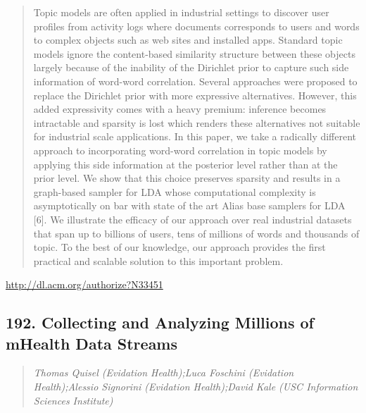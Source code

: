 \documentclass{article}
\begin{document}
\begin{quote}
Topic models are often applied in industrial settings to discover user profiles from activity logs where documents corresponds to users and words to complex objects such as web sites and installed apps. Standard topic models ignore the content-based similarity structure between these objects largely because of the inability of the Dirichlet prior to capture such side information of word-word correlation. Several approaches were proposed to replace the Dirichlet prior with more expressive alternatives. However, this added expressivity comes with a heavy premium: inference becomes intractable and sparsity is lost which renders these alternatives not suitable for industrial scale applications. In this paper, we take a radically different approach to incorporating word-word correlation in topic models by applying this side information at the posterior level rather than at the prior level. We show that this choice preserves sparsity and results in a graph-based sampler for LDA whose computational complexity is asymptotically on bar with state of the art Alias base samplers for LDA [6]. We illustrate the efficacy of our approach over real industrial datasets that span up to billions of users, tens of millions of words and thousands of topic. To the best of our knowledge, our approach provides the first practical and scalable solution to this important problem.
\end{quote}

\href{http://dl.acm.org/authorize?N33451}{http://dl.acm.org/authorize?N33451}

\subsection{192. Collecting and Analyzing Millions of mHealth Data Streams}

\begin{quote}
\footnotesize{\textit{Thomas Quisel (Evidation Health);Luca Foschini (Evidation Health);Alessio Signorini (Evidation Health);David Kale (USC Information Sciences Institute)}}

\end{quote}
\end{document}
